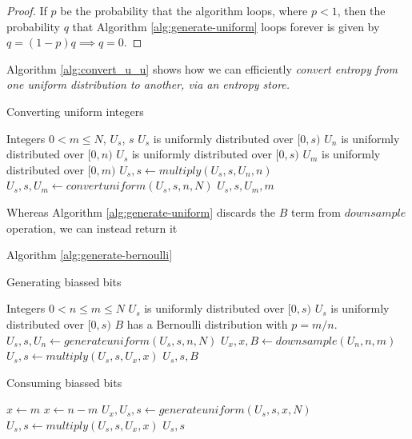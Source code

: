 \documentclass[12pt]{article}
\begin{document}
\begin{proof}
    If $p$ be the probability that the algorithm loops, where $p<1$, then the probability $q$ that Algorithm \ref{alg:generate-uniform} loops forever is given by $q = (1-p)q \implies q=0$.
\end{proof}


Algorithm \ref{alg:convert_u_u} shows how we can efficiently \em convert \em entropy from one uniform distribution to another, via an entropy store.

\begin{algorithm}
\caption{Converting uniform integers}
\label{alg:convert_u_u}
\begin{algorithmic}[1]
    \Require Integers $0 < m \le N$, $U_s$, $s$
    \Require $U_s$ is uniformly distributed over $[0,s)$
    \Require $U_n$ is uniformly distributed over $[0,n)$
    \Ensure  $U_s$ is uniformly distributed over $[0,s)$
    \Ensure  $U_m$ is uniformly distributed over $[0,m)$
    \State $U_s, s \gets multiply(U_s, s, U_n, n)$
    \State $U_s, s, U_m \gets convertuniform(U_s, s, n, N)$
    \State \Return $U_s, s, U_m, m$
\EndProcedure
\end{algorithmic}
\end{algorithm}

Whereas Algorithm \ref{alg:generate-uniform} discards the $B$ term from $downsample$ operation, we can instead return it 

Algorithm \ref{alg:generate-bernoulli}

\begin{algorithm}
\caption{Generating biassed bits}
\label{alg:generate-bernoulli}
\begin{algorithmic}[1]
\Require Integers $0 < n \le m \le N$
\Require $U_s$ is uniformly distributed over $[0,s)$
\Ensure $U_s$ is uniformly distributed over $[0,s)$
\Ensure $B$ has a Bernoulli distribution with $p = m/n$.
    \State $U_s, s, U_n \gets generateuniform(U_s, s, n, N)$
    \State $U_x, x, B \gets downsample(U_n, n, m)$
    \State $U_s, s \gets multiply(U_s, s, U_x, x)$
    \State \Return $U_s, s, B$
\EndProcedure
\end{algorithmic}
\end{algorithm}

\begin{algorithm}
\caption{Consuming biassed bits}
\label{alg:consume_b}
\begin{algorithmic}[1]
        \State $x \gets m$
    \Else
        \State $x \gets n-m$
    \EndIf
    \State $U_x, U_s, s \gets generateuniform(U_s, s, x, N)$
    \State $U_s, s \gets multiply(U_s, s, U_x, x)$
    \State \Return $U_s, s$
\EndProcedure
\end{algorithmic}
\end{algorithm}
\end{document}
